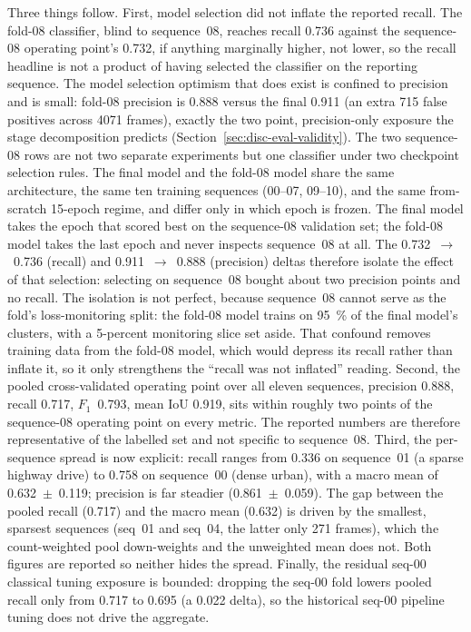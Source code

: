 Three things follow. First, model selection did not inflate the reported
recall. The fold-08 classifier, blind to sequence~08, reaches recall \num{0.736} against
the sequence-08 operating point's \num{0.732}, if anything marginally higher,
not lower, so the recall headline is not a product of having selected the
classifier on the reporting sequence. The model selection optimism that does
exist is confined to precision and is small: fold-08 precision is \num{0.888}
versus the final \num{0.911} (an extra \num{715} false positives across
\num{4071} frames), exactly the two point, precision-only exposure the stage
decomposition predicts (Section~\ref{sec:disc-eval-validity}). The two
sequence-08 rows are not two separate experiments but one classifier under
two checkpoint selection rules. The final model and the fold-08 model share the
same architecture, the same ten training sequences (00--07,
09--10), and the same from-scratch \num{15}-epoch regime, and differ
only in which epoch is frozen. The final model takes the epoch that scored
best on the sequence-08 validation set; the fold-08 model takes the last epoch and
never inspects sequence~08 at all. The \num{0.732}~$\rightarrow$~\num{0.736}
(recall) and \num{0.911}~$\rightarrow$~\num{0.888} (precision) deltas therefore
isolate the effect of that selection: selecting on sequence~08 bought about two
precision points and no recall. The isolation is not perfect, because
sequence~08 cannot serve as the fold's loss-monitoring split: the fold-08 model
trains on \SI{95}{\percent} of the final model's clusters, with a \num{5}-percent
monitoring slice set aside. That confound removes training data from
the fold-08 model, which would depress its recall rather than inflate it, so it only
strengthens the ``recall was not inflated'' reading. Second, the
pooled cross-validated operating point over all eleven sequences,
precision \num{0.888}, recall \num{0.717}, $F_1$~\num{0.793}, mean IoU
\num{0.919}, sits within roughly two points of the sequence-08 operating point
on every metric. The reported numbers are therefore representative of the labelled set
and not specific to sequence~08. Third, the per-sequence spread is now
explicit: recall ranges from \num{0.336} on sequence~01 (a sparse highway drive)
to \num{0.758} on sequence~00 (dense urban), with a macro mean of
\num{0.632}~$\pm$~\num{0.119}; precision is far steadier
(\num{0.861}~$\pm$~\num{0.059}). The gap between the pooled recall (\num{0.717})
and the macro mean (\num{0.632}) is driven by the smallest, sparsest sequences
(seq~01 and seq~04, the latter only \num{271} frames), which the count-weighted
pool down-weights and the unweighted mean does not. Both figures are reported so
neither hides the spread. Finally, the residual seq-00 classical tuning exposure
is bounded: dropping the seq-00 fold lowers pooled recall only from \num{0.717}
to \num{0.695} (a \num{0.022} delta), so the historical seq-00 pipeline tuning
does not drive the aggregate.

